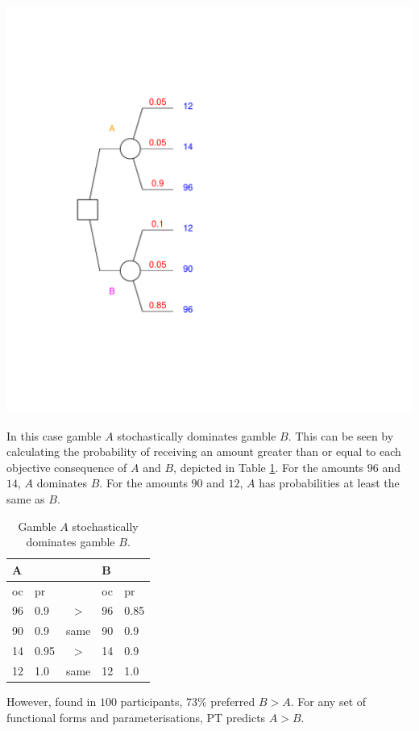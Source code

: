 \documentclass{article}\usepackage[]{graphicx}\usepackage[]{color}
\newenvironment{knitrout}{}{} %
\begin{document}
\begin{knitrout}
{\centering \includegraphics[width=0.8\linewidth]{figure/unnamed-chunk-49} 

}



\end{knitrout}


In this case gamble $A$ stochastically dominates gamble $B$. This can be seen by calculating the probability of receiving an amount greater than or equal to each objective consequence of $A$ and $B$, depicted in
Table \ref{stochastic_dominance_table}. For the amounts $96$ and $14$, $A$ dominates $B$. For the amounts $90$ and
$12$, $A$ has probabilities at least the same as $B$.

\begin{table}[!h]
\caption{Gamble $A$ stochastically dominates gamble $B$.}
\centering
\begin{tabular}{ l l c l l }
\hline
A &   &   & B &   \\
\hline
oc & pr  &   & oc & pr  \\
\hline
96 & 0.9 & $>$ & 96 & 0.85 \\
90 & 0.9 & same & 90 & 0.9 \\
14 & 0.95 & $>$ & 14 & 0.9 \\
12 & 1.0 & same & 12 & 1.0 \\
\hline
\end{tabular}
\label{stochastic_dominance_table}
\end{table}

However, \citet[][Table 1 p. 61]{Birnbaum_Navarrete_1998} found in $100$ participants, $73\%$ preferred $B > A$.
For any set of functional forms and parameterisations, PT predicts $A > B$.
\end{document}
